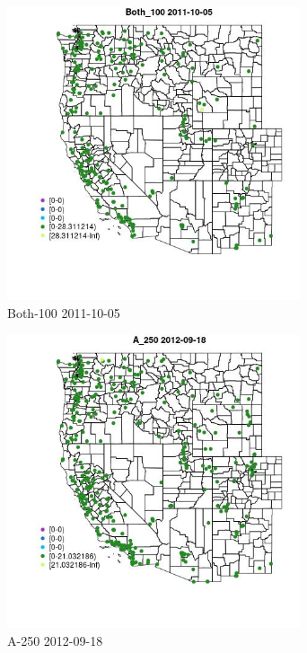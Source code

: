 \begin{figure} 
\centering  
\includegraphics[width=0.77\textwidth]{Code_Outputs/ML_input_report_ML_input_PM25_Step5_part_d_de_duplicated_aves_ML_input_MapObsBoth_1002011-10-05.jpg} 
\caption{\label{fig:ML_input_report_ML_input_PM25_Step5_part_d_de_duplicated_aves_ML_inputMapObsBoth_1002011-10-05}Both-100 2011-10-05} 
\end{figure} 
 

\begin{figure} 
\centering  
\includegraphics[width=0.77\textwidth]{Code_Outputs/ML_input_report_ML_input_PM25_Step5_part_d_de_duplicated_aves_ML_input_MapObsA_2502012-09-18.jpg} 
\caption{\label{fig:ML_input_report_ML_input_PM25_Step5_part_d_de_duplicated_aves_ML_inputMapObsA_2502012-09-18}A-250 2012-09-18} 
\end{figure} 
 

